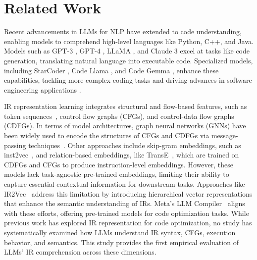 \section{Related Work}
\label{sec:related_work} 
Recent advancements in LLMs for NLP have extended to code understanding, enabling models to comprehend high-level languages like Python, C++, and Java. Models such as GPT-3 \cite{brown2020gpt3}, GPT-4 \cite{openai2023gpt4}, LLaMA \cite{touvron2023llama}, and Claude 3 \cite{claude3} excel at tasks like code generation, translating natural language into executable code. Specialized models, including StarCoder \cite{li2023starcoder}, Code Llama \cite{rozière2024codellamaopenfoundation}, and Code Gemma \cite{team2024codegemma}, enhance these capabilities, tackling more complex coding tasks and driving advances in software engineering applications \cite{zhao2023survey}.

IR representation learning integrates structural and flow-based features, such as token sequences~\cite{peng2021could}, control flow graphs (CFGs)\cite{2020ir2vec, yu2020codecmr}, and control-data flow graphs (CDFGs)\cite{ben2018neural, brauckmann2020compiler, cummins2021programl}.
In terms of model architectures, graph neural networks (GNNs) have been widely used to encode the structures of CFGs and CDFGs via message-passing techniques~\cite{brauckmann2020compiler, cummins2021programl, yu2020codecmr}. Other approaches include skip-gram embeddings, such as inst2vec~\cite{ben2018neural}, and relation-based embeddings, like TransE~\cite{bordes2013transE}, which are trained on CDFGs and CFGs to produce instruction-level embeddings. However, these models lack task-agnostic pre-trained embeddings, limiting their ability to capture essential contextual information for downstream tasks.
Approaches like IR2Vec~\cite{2020ir2vec} address this limitation by introducing hierarchical vector representations that enhance the semantic understanding of IRs.
Meta's LLM Compiler~\cite{llmscompiler} aligns with these efforts, offering pre-trained models for code optimization tasks. 
While previous work has explored IR representation for code optimization, no study has systematically examined how LLMs understand IR syntax, CFGs, execution behavior, and semantics. This study provides the first empirical evaluation of LLMs' IR comprehension across these dimensions.

